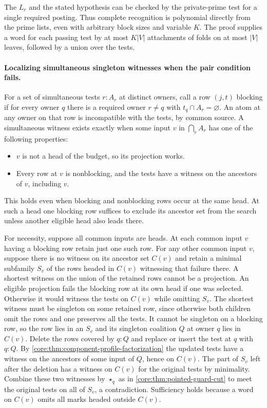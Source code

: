 The $L_r$ and the stated hypothesis can be checked by
the private-prime test for a single required posting.
Thus complete recognition is polynomial directly
from the prime lists, even with arbitrary block sizes
and variable $K$. The proof supplies a word for each
passing test by at most $K|V|$ attachments of folds on
at most $|V|$ leaves, followed by a union over the tests.

\paragraph{Localizing simultaneous singleton witnesses when the pair condition fails.}
For a set of simultaneous tests $r:A_r$ at distinct owners, call
a row $(j,t)$ blocking if for every owner $q$ there is a required
owner $r\ne q$ with $t_q\cap A_r=\varnothing$. An atom at any owner
on that row is incompatible with the tests, by common source.
A simultaneous witness exists exactly when some input $v$ in
$\bigcap_r A_r$ has one of the following properties:
\begin{itemize}
\item $v$ is not a head of the budget, so its projection works.
\item Every row at $v$ is nonblocking, and the tests have a witness
on the ancestors of $v$, including $v$.
\end{itemize}
This holds even when blocking and nonblocking rows occur at the
same head. At such a head one blocking row suffices to exclude
its ancestor set from the search unless another eligible head
also leads there.

For necessity, suppose all common inputs are heads. At each
common input $v$ having a blocking row retain just one such row.
For any other common input $v$, suppose there is no witness on
its ancestor set $C(v)$ and retain a minimal subfamily $S_v$ of
the rows headed in $C(v)$ witnessing that failure there. A
shortest witness on the union of the retained rows cannot be a
projection. An eligible projection fails the blocking row at
its own head if one was selected. Otherwise it would witness
the tests on $C(v)$ while omitting $S_v$. The shortest witness
must be singleton on some retained row, since otherwise both
children omit the rows and one preserves all the tests. It
cannot be singleton on a blocking row, so the row lies in an
$S_v$ and its singleton coalition $Q$ at owner $q$ lies in $C(v)$.
Delete the rows covered by $q:Q$ and replace or insert the
test at $q$ with $q:Q$. By
\cref{core:thm:component-profile-factorization} the updated tests
have a witness on the ancestors of some input of $Q$, hence on
$C(v)$. The part of $S_v$ left after the deletion has a witness
on $C(v)$ for the original tests by minimality. Combine these
two witnesses by $\star_q$ as in \cref{core:thm:pointed-guard-cut}
to meet the original tests on all of $S_v$, a contradiction.
Sufficiency holds because a word on $C(v)$ omits all marks
headed outside $C(v)$.

